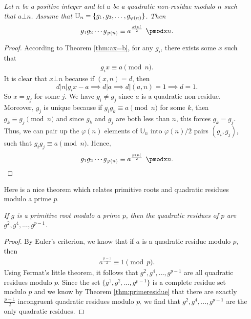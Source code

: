 \documentclass{subfile}
\begin{document}
	\begin{theorem}\slshape\label{prd}
		Let $n$ be a positive integer and let $a$ be a quadratic non-residue modulo $n$ such that $a\bot n$. Assume that $\mathbb U_n = \{g_1, g_2, \ldots, g_{\varphi(n)}\}$. Then
		\[g_1g_2\cdots g_{\t(n)}\equiv a^{\frac{\t(n)}{2}}\pmod n.\]
	\end{theorem}
	
	\begin{proof}
		According to Theorem \ref{thm:ax=b}, for any $g_i$, there exists some $x$ such that
			\begin{align}
				g_i x\equiv a\pmod n.
			\end{align}
		It is clear that $x \bot n$ because if $(x,n)=d$, then
			\[d|n|g_ix - a \implies d|a \implies d|(a,n)=1 \implies d=1.\]
		So $x=g_j$ for some $j$. We have $g_i \neq g_j$ since $a$ is a quadratic non-residue. Moreover, $g_j$ is unique because if $g_ig_k \equiv a \pmod n$ for some $k$, then $g_k \equiv g_j \pmod n$ and since $g_k$ and $g_j$ are both less than $n$, this forces $g_k=g_j$. Thus, we can pair up the $\varphi(n)$ elements of $\mathbb{U}_n$ into $\varphi(n)/2$ pairs $(g_i, g_j)$, such that $g_ig_j \equiv a \pmod n$. Hence, 
			\begin{equation*}
			g_1g_2\cdots g_{\t(n)}\equiv a^{\frac{\t(n)}{2}}\pmod n. \qedhere
			\end{equation*}
	\end{proof}
Here is a nice theorem which relates primitive roots and quadratic residues modulo a prime $p$.
	\begin{theorem}\slshape\label{thm:pr+qr}
		If $g$ is a primitive root modulo a prime $p$, then the quadratic residues of $p$ are $g^2,g^4,\ldots,g^{p-1}$.
	\end{theorem}

	\begin{proof}
		By Euler's criterion, we know that if $a$ is a quadratic residue modulo $p$, then
			\begin{align*}
				a^{\frac{p-1}{2}} \equiv 1 \pmod p.
			\end{align*}
		Using Fermat's little theorem, it follows that $g^2,g^4,\ldots,g^{p-1}$ are all quadratic residues modulo $p$. Since the set $\{g^1,g^2,\ldots,g^{p-1}\}$ is a complete residue set modulo $p$ and we know by Theorem \ref{thm:primeresidue} that there are exactly $\frac{p-1}{2}$ incongruent quadratic residues modulo $p$, we find that $g^2,g^4,\ldots,g^{p-1}$ are the only quadratic residues.
	\end{proof}
	
\end{document}
